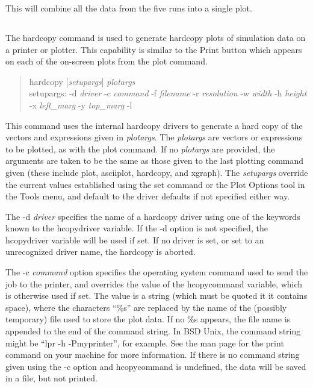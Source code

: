 This will combine all the data from the five runs into a single
plot.

\subsection{}


The {\cb hardcopy} command is used to generate hardcopy plots of
simulation data on a printer or plotter.  This capability is similar
to the {\cb Print} button which appears on each of the on-screen plots
from the {\cb plot} command.
\begin{quote}\vt
hardcopy [{\it setupargs\/}] {\it plotargs\/}\\
setupargs: -d {\it driver} -c {\it command} -f {\it filename}
 -r {\it resolution} -w {\it width} -h {\it height}\\
 -x {\it left\_marg} -y {\it top\_marg} -l
\end{quote}
This command uses the internal hardcopy drivers to generate a hard
copy of the vectors and expressions given in {\it plotargs}.  The {\it
plotargs} are vectors or expressions to be plotted, as with the {\cb
plot} command.  If no {\it plotargs} are provided, the arguments are
taken to be the same as those given to the last plotting command given
(these include {\cb plot}, {\cb asciiplot}, {\cb hardcopy}, and {\cb
xgraph}).  The {\it setupargs} override the current values established
using the {\cb set} command or the {\cb Plot Options} tool in the {\cb
Tools} menu, and default to the driver defaults if not specified
either way.

The {\vt -d} {\it driver} specifies the name of a hardcopy driver
using one of the keywords known to the {\et hcopydriver} variable.  If
the {\vt -d} option is not specified, the {\et hcopydriver} variable
will be used if set.  If no driver is set, or set to an unrecognized
driver name, the hardcopy is aborted.

The {\vt -c} {\it command} option specifies the operating system
command used to send the job to the printer, and overrides the value
of the {\et hcopycommand} variable, which is otherwise used if set. 
The value is a string (which must be quoted it it contains space),
where the characters ``{\vt \%s}'' are replaced by the name of the
(possibly temporary) file used to store the plot data.  If no {\vt
\%s} appears, the file name is appended to the end of the command
string.  In BSD Unix, the command string might be ``{\vt lpr -h
-Pmyprinter}'', for example.  See the man page for the print command
on your machine for more information.  If there is no command string
given using the {\vt -c} option and {\et hcopycommand} is undefined,
the data will be saved in a file, but not printed.

